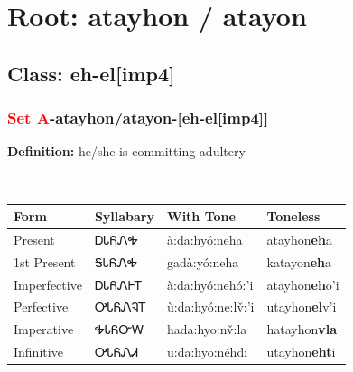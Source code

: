 \needspace{4in}
\section*{Root: atayhon / atayon}
\nopagebreak
{}
\needspace{3in}
\subsection*{Class: eh-el[imp4]}
\nopagebreak
\needspace{2in}
\subsubsection*{\textcolor{Red}{Set A}{-}\textbf{atayhon/atayon}{-}[eh-el[imp4]]}
\nopagebreak
\textbf{Definition: } he/she is committing adultery
\\[0.5em]
\begin{tabularx}{\textwidth}{l X X X}%
\toprule%
\textbf{Form}&\textbf{Syllabary}&\textbf{With Tone}&\textbf{Toneless}\\%
\midrule%
Present&ᎠᏓᏲᏁᎭ&à:da:hyó:neha&atayhon\textbf{eh}a\\%
1st Present&ᎦᏓᏲᏁᎭ&gadà:yó:neha&katayon\textbf{eh}a\\%
Imperfective&ᎠᏓᏲᏁᎰᎢ&à:da:hyó:nehó:’i&atayhon\textbf{eh}o'i\\%
Perfective&ᎤᏓᏲᏁᎸᎢ&ù:da:hyó:ne:lv̌:’i&utayhon\textbf{el}v'i\\%
Imperative&ᎭᏓᏲᏅᎳ&hada:hyo:nv̌:la&hatayhon\textbf{vla}\\%
Infinitive&ᎤᏓᏲᏁᏗ&u:da:hyo:néhdi&utayhon\textbf{eht}i\\%
\bottomrule%
\end{tabularx}
\\[1em]